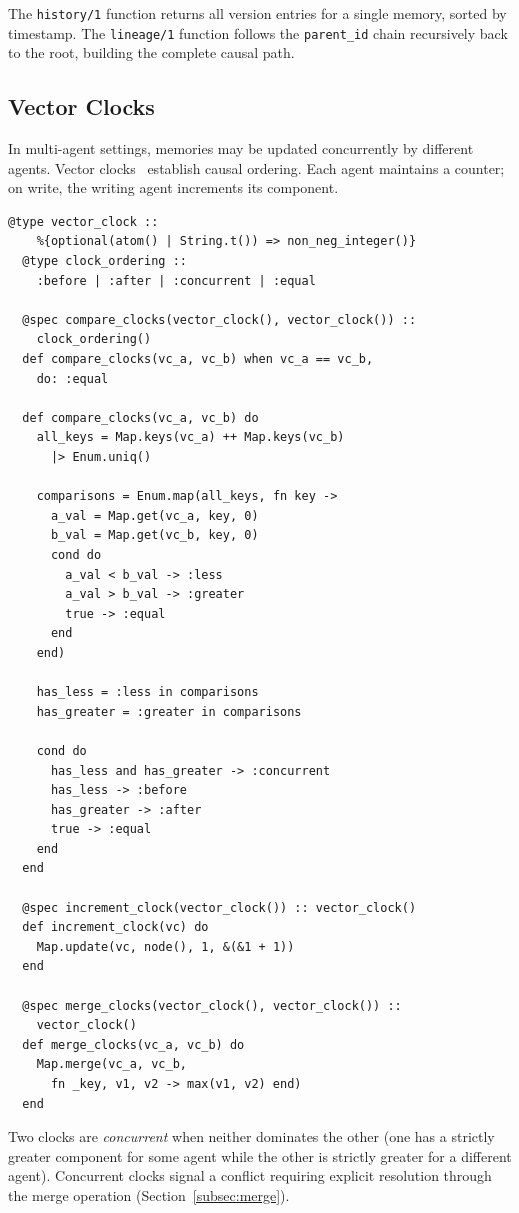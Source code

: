 \documentclass[12pt,a4paper]{article}
\theoremstyle{definition}
\begin{document}
The \texttt{history/1} function returns all version entries for a single memory, sorted by timestamp.
The \texttt{lineage/1} function follows the \texttt{parent\_id} chain recursively back to the root, building the complete causal path.

\subsection{Vector Clocks}\label{subsec:vector-clocks}

In multi-agent settings, memories may be updated concurrently by different agents.
Vector clocks~\citep{lamport1978time, fidge1988timestamps} establish causal ordering.
Each agent maintains a counter; on write, the writing agent increments its component.

\begin{lstlisting}[caption={Vector clock comparison for conflict detection.}, label={lst:vector-clocks}]
  @type vector_clock ::
    %{optional(atom() | String.t()) => non_neg_integer()}
  @type clock_ordering ::
    :before | :after | :concurrent | :equal

  @spec compare_clocks(vector_clock(), vector_clock()) ::
    clock_ordering()
  def compare_clocks(vc_a, vc_b) when vc_a == vc_b,
    do: :equal

  def compare_clocks(vc_a, vc_b) do
    all_keys = Map.keys(vc_a) ++ Map.keys(vc_b)
      |> Enum.uniq()

    comparisons = Enum.map(all_keys, fn key ->
      a_val = Map.get(vc_a, key, 0)
      b_val = Map.get(vc_b, key, 0)
      cond do
        a_val < b_val -> :less
        a_val > b_val -> :greater
        true -> :equal
      end
    end)

    has_less = :less in comparisons
    has_greater = :greater in comparisons

    cond do
      has_less and has_greater -> :concurrent
      has_less -> :before
      has_greater -> :after
      true -> :equal
    end
  end

  @spec increment_clock(vector_clock()) :: vector_clock()
  def increment_clock(vc) do
    Map.update(vc, node(), 1, &(&1 + 1))
  end

  @spec merge_clocks(vector_clock(), vector_clock()) ::
    vector_clock()
  def merge_clocks(vc_a, vc_b) do
    Map.merge(vc_a, vc_b,
      fn _key, v1, v2 -> max(v1, v2) end)
  end
\end{lstlisting}

Two clocks are \emph{concurrent} when neither dominates the other (one has a strictly greater component for some agent while the other is strictly greater for a different agent).
Concurrent clocks signal a conflict requiring explicit resolution through the merge operation (Section~\ref{subsec:merge}).
\end{document}
